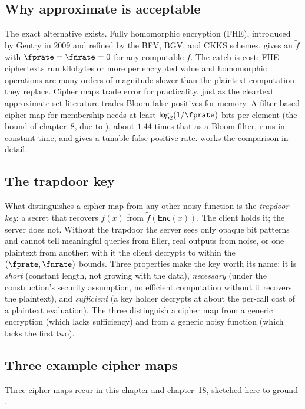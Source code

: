 \subsection*{Why approximate is acceptable}

The exact alternative exists. Fully homomorphic encryption (FHE),
introduced by Gentry in 2009 and refined by the BFV, BGV, and CKKS
schemes, gives an $\tilde f$ with $\fprate = \fnrate = 0$ for any
computable $f$. The catch is cost: FHE ciphertexts run kilobytes or more
per encrypted value and homomorphic operations are many orders of
magnitude slower than the plaintext computation they replace. Cipher maps trade error for practicality, just as
the cleartext approximate-set literature trades Bloom false positives for
memory. A filter-based cipher map for membership needs at least
$\log_2(1/\fprate)$ bits per element (the bound of chapter~8, due to
\textcite{carter-et-al-1978}), about $1.44$ times that as a Bloom
filter, runs in constant time, and gives a tunable false-positive rate.  works the comparison in detail.

\subsection*{The trapdoor key}

What distinguishes a cipher map from any other noisy function is the
\emph{trapdoor key}: a secret that recovers $f(x)$ from
$\tilde f(\mathsf{Enc}(x))$. The client holds it; the server does not.
Without the trapdoor the server sees only opaque bit patterns and cannot
tell meaningful queries from filler, real outputs from noise, or one
plaintext from another; with it the client decrypts to within the
$(\fprate, \fnrate)$ bounds. Three properties make the key worth its
name: it is \emph{short} (constant length, not growing with the data),
\emph{necessary} (under the construction's security assumption, no
efficient computation without it recovers the plaintext), and
\emph{sufficient} (a key holder decrypts at about the per-call cost of a
plaintext evaluation). The three distinguish a cipher
map from a generic encryption (which lacks sufficiency) and from a
generic noisy function (which lacks the first two).

\subsection*{Three example cipher maps}

Three cipher maps recur in this chapter and chapter~18, sketched here to
ground .


